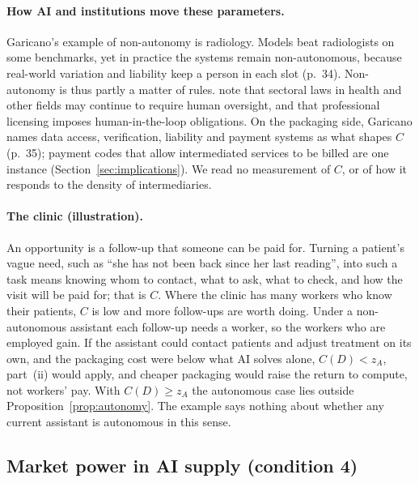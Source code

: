 \documentclass[12pt]{article}
\theoremstyle{remark}
\begin{document}
\paragraph{How AI and institutions move these parameters.} Garicano's example of non-autonomy is radiology. Models beat radiologists on some benchmarks, yet in practice the systems remain non-autonomous, because real-world variation and liability keep a person in each slot (p.~34). Non-autonomy is thus partly a matter of rules. \citet[\S12.6.3, p.~318]{brynjolfsson2026hayek} note that sectoral laws in health and other fields may continue to require human oversight, and that professional licensing imposes human-in-the-loop obligations. On the packaging side, Garicano names data access, verification, liability and payment systems as what shapes $C$ (p.~35); payment codes that allow intermediated services to be billed are one instance (Section~\ref{sec:implications}). We read no measurement of $C$, or of how it responds to the density of intermediaries.

\paragraph{The clinic (illustration).} An opportunity is a follow-up that someone can be paid for. Turning a patient's vague need, such as ``she has not been back since her last reading'', into such a task means knowing whom to contact, what to ask, what to check, and how the visit will be paid for; that is $C$. Where the clinic has many workers who know their patients, $C$ is low and more follow-ups are worth doing. Under a non-autonomous assistant each follow-up needs a worker, so the workers who are employed gain. If the assistant could contact patients and adjust treatment on its own, and the packaging cost were below what AI solves alone, $C(D)<z_A$, part~(ii) would apply, and cheaper packaging would raise the return to compute, not workers' pay. With $C(D)\ge z_A$ the autonomous case lies outside Proposition~\ref{prop:autonomy}. The example says nothing about whether any current assistant is autonomous in this sense.

\subsection{Market power in AI supply (condition 4)}\label{sec:market}
\end{document}
